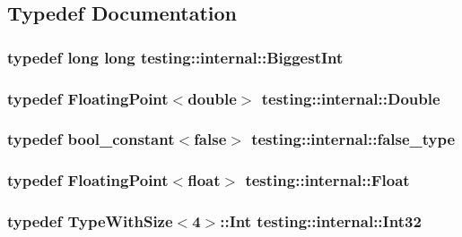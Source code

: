 \subsection{Typedef Documentation}
\hypertarget{namespacetesting_1_1internal_a05c6bd9ede5ccdf25191a590d610dcc6}{
\subsubsection[{Biggest\-Int}]{\setlength{\rightskip}{0pt plus 5cm}typedef long long {\bf testing\-::internal\-::\-Biggest\-Int}}}\label{namespacetesting_1_1internal_a05c6bd9ede5ccdf25191a590d610dcc6}
\hypertarget{namespacetesting_1_1internal_a66a7579b1893b260c31dad577f7a5c48}{
\subsubsection[{Double}]{\setlength{\rightskip}{0pt plus 5cm}typedef {\bf Floating\-Point}$<$double$>$ {\bf testing\-::internal\-::\-Double}}}\label{namespacetesting_1_1internal_a66a7579b1893b260c31dad577f7a5c48}
\hypertarget{namespacetesting_1_1internal_abb1d0789f19bdde21affccbd1078b525}{
\subsubsection[{false\-\_\-type}]{\setlength{\rightskip}{0pt plus 5cm}typedef {\bf bool\-\_\-constant}$<$false$>$ {\bf testing\-::internal\-::false\-\_\-type}}}\label{namespacetesting_1_1internal_abb1d0789f19bdde21affccbd1078b525}
\hypertarget{namespacetesting_1_1internal_a02e1981f5ff70609e6ac06e006ff519a}{
\subsubsection[{Float}]{\setlength{\rightskip}{0pt plus 5cm}typedef {\bf Floating\-Point}$<$float$>$ {\bf testing\-::internal\-::\-Float}}}\label{namespacetesting_1_1internal_a02e1981f5ff70609e6ac06e006ff519a}
\hypertarget{namespacetesting_1_1internal_a8ee38faaf875f133358abaf9bc056cec}{
\subsubsection[{Int32}]{\setlength{\rightskip}{0pt plus 5cm}typedef {\bf Type\-With\-Size}$<$4$>$\-::Int {\bf testing\-::internal\-::\-Int32}}}\label{namespacetesting_1_1internal_a8ee38faaf875f133358abaf9bc056cec}
